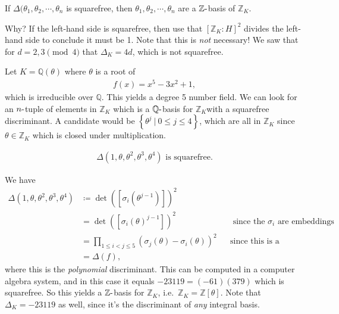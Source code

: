 \begin{corollary}

If \({\Delta}( { { \theta}_1, { \theta}_2, \cdots, { \theta}_{n}}\) is
squarefree, then \({ {\theta}_1, {\theta}_2, \cdots, {\theta}_{n}}\) are
a \({\mathbb{Z}}{\hbox{-}}\)basis of \({\mathbb{Z}}_K\).

\end{corollary}

\begin{remark}

Why? If the left-hand side is squarefree, then use that
\([{\mathbb{Z}}_K: H]^2\) divides the left-hand side to conclude it must
be 1. Note that this is \emph{not} necessary! We saw that for
\(d = 2,3 \pmod 4\) that \({\Delta}_K = 4d\), which is not squarefree.

\end{remark}

\begin{example}

Let \(K = {\mathbb{Q}}( \theta)\) where \(\theta\) is a root of
\begin{align*}
f(x) = x^5 - 3x^2 + 1
,\end{align*}
which is irreducible over \({\mathbb{Q}}\). This yields a degree 5
number field. We can look for an \(n{\hbox{-}}\)tuple of elements in
\({\mathbb{Z}}_K\) which is a \({\mathbb{Q}}{\hbox{-}}\)basis for
\({\mathbb{Z}}_K\)with a squarefree discriminant. A candidate would be
\(\left\{{ \theta^j {~\mathrel{\Big|}~}0\leq j \leq 4 }\right\}\), which
are all in \({\mathbb{Z}}_K\) since \(\theta\in {\mathbb{Z}}_K\) which
is closed under multiplication.

\begin{claim}

\begin{align*}
{\Delta}( 1, \theta, \theta^2, \theta^3, \theta^4) \text{ is squarefree}
.\end{align*}

\end{claim}

We have
\begin{align*}
{\Delta}( 1, \theta, \theta^2, \theta^3, \theta^4)
&\coloneqq\det( {\left[ { \sigma_i ( \theta^{j-1} ) } \right]} )^2 \\
&= \det( {\left[ { \sigma_i ( \theta )^{j-1} } \right]} )^2 && \text{ since the $\sigma_i$ are embeddings } \\
&= \prod_{1\leq i < j \leq 5} ( \sigma_j( \theta) - \sigma_i( \theta ) )^2 &&\text{since this is a Vandermonde matrix}\\
&= {\Delta}(f)
,\end{align*}
where this is the \emph{polynomial} discriminant. This can be computed
in a computer algebra system, and in this case it equals
\(-23119 = (-61)(379)\) which is squarefree. So this yields a
\({\mathbb{Z}}{\hbox{-}}\)basis for \({\mathbb{Z}}_K\),
i.e.~\({\mathbb{Z}}_K = {\mathbb{Z}}[ \theta]\). Note that
\({\Delta}_K = -23119\) as well, since it's the discriminant of
\emph{any} integral basis.

\end{example}

